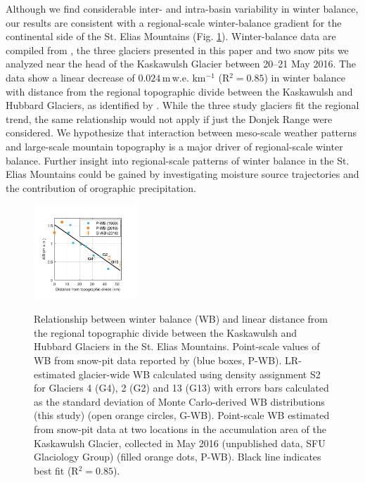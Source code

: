 \documentclass[review,oneside, letterpaper]{igs} %
\begin{document}
Although we find considerable inter- and intra-basin variability in winter balance, our results are consistent with a regional-scale winter-balance gradient for the continental side of the St. Elias Mountains (Fig. \ref{fig:AccumGrad}). Winter-balance data are compiled from \cite{Taylor1969}, the three glaciers presented in this paper and two snow pits we analyzed near the head of the Kaskawulsh Glacier between 20--21 May 2016. The data show a linear decrease of $0.024$\,m\,w.e. km$^{-1}$ (R$^2=0.85$) in winter balance with distance from the regional topographic divide between the Kaskawulsh and Hubbard Glaciers, as identified by \cite{Taylor1969}. While the three study glaciers fit the regional trend, the same relationship would not apply if just the Donjek Range were considered. We hypothesize that interaction between meso-scale weather patterns and large-scale mountain topography is a major driver of regional-scale winter balance. Further insight into regional-scale patterns of winter balance in the St. Elias Mountains could be gained by investigating moisture source trajectories and the contribution of orographic precipitation. 

\begin{figure}
	\centering
	\includegraphics[width =0.35\textwidth]{AccumGrad.pdf}\\
	\caption{Relationship between winter balance (WB) and linear distance from the regional topographic divide between the Kaskawulsh and Hubbard Glaciers in the St. Elias Mountains. Point-scale values of WB from snow-pit data reported by \cite{Taylor1969} (blue boxes, P-WB). LR-estimated glacier-wide WB calculated using density assignment S2 for Glaciers 4 (G4), 2 (G2) and 13 (G13) with errors bars calculated as the standard deviation of Monte Carlo-derived WB distributions (this study) (open orange circles, G-WB). Point-scale WB estimated from snow-pit data at two locations in the accumulation area of the Kaskawulsh Glacier, collected in May 2016 (unpublished data, SFU Glaciology Group) (filled orange dots, P-WB). Black line indicates best fit (R$^2=0.85$).}
	\label{fig:AccumGrad}
\end{figure}
\end{document}
